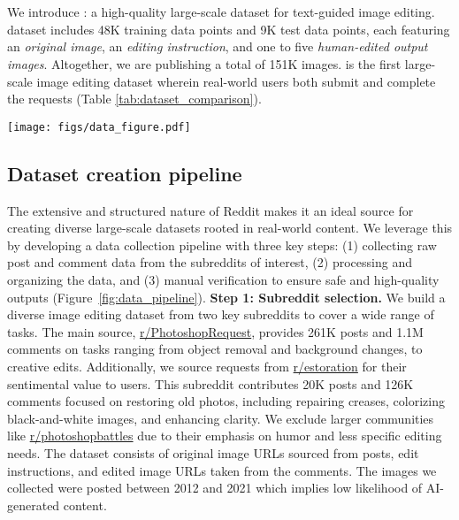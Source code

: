 \section{\RealEdit}
\label{sec:realedit}

We introduce \RealEdit: a high-quality large-scale dataset for text-guided image editing. \RealEdit dataset includes 48K training data points and 9K test data points, each featuring an \textit{original image}, an \textit{editing instruction}, and one to five \textit{human-edited output images}. Altogether, we are publishing a total of 151K images. \RealEdit is the first large-scale image editing dataset wherein real-world users both submit and complete the requests (Table \ref{tab:dataset_comparison}).



\begin{figure*}[!h]
    \centering
    \texttt{[image: figs/data\_figure.pdf]}
    \caption{\textbf{Dataset curation pipeline.} We source data from r/estoration and r/PhotoshopRequest. From the posts, we extract input images and edit instructions. The instructions are processed using a VLM to isolate the editing task. From the comments, we collect up to 5 human-edited outputs per post.}
    \label{fig:data_pipeline}
    \vspace{-2mm}
\end{figure*}

\subsection{Dataset creation pipeline}
The extensive and structured nature of Reddit makes it an ideal source for creating diverse large-scale datasets rooted in real-world content. We leverage this by developing a data collection pipeline with three key steps: (1) collecting raw post and comment data from the subreddits of interest, (2) processing and organizing the data, and (3) manual verification to ensure safe and high-quality outputs (Figure~\ref{fig:data_pipeline}).
\noindent\textbf{Step 1: Subreddit selection.}
We build a diverse image editing dataset from two key subreddits to cover a wide range of tasks. The main source, \href{https://www.reddit.com/r/PhotoshopRequest/}{r/PhotoshopRequest}, provides 261K posts and 1.1M comments on tasks ranging from object removal and background changes, to creative edits.
Additionally, we source requests from \href{https://www.reddit.com/r/estoration/}{r/estoration} for their sentimental value to users.
This subreddit contributes 20K posts and 126K comments focused on restoring old photos, including repairing creases, colorizing black-and-white images, and enhancing clarity.
We exclude larger communities like \href{https://www.reddit.com/r/photoshopbattles/}{r/photoshopbattles} due to their emphasis on humor and less specific editing needs. The dataset consists of original image URLs sourced from posts, edit instructions, and edited image URLs taken from the comments. The images we collected were posted between 2012 and 2021 which implies low likelihood of AI-generated content. 


